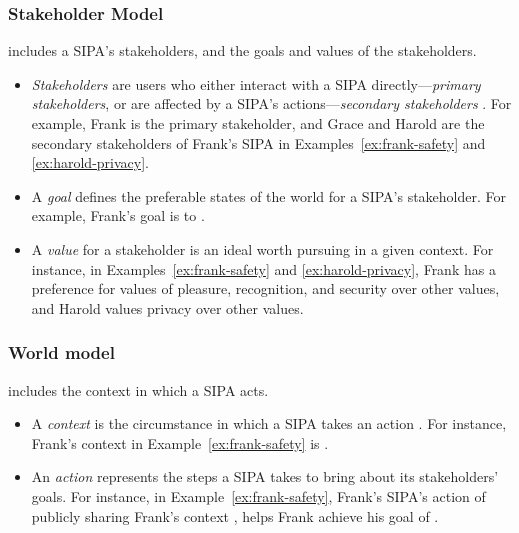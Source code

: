 \subsubsection{Stakeholder Model}
includes a SIPA's stakeholders, and the goals and values of the stakeholders. 

\begin{itemize}
\item \emph{Stakeholders} are users who either interact with a SIPA directly---\emph{primary stakeholders}, or are affected by a SIPA's actions---\emph{secondary stakeholders} \citep{Friedman-2008-value-sensitive-design}. For example, Frank is the primary stakeholder, and Grace and Harold are the secondary stakeholders of Frank's \locationapp SIPA in Examples~\ref{ex:frank-safety} and \ref{ex:harold-privacy}.
\item A \emph{goal} defines the preferable states of the world for a SIPA's stakeholder. For example, Frank's goal is to . 
\item A \emph{value} for a stakeholder is an ideal worth pursuing in a given context. For instance, in Examples~\ref{ex:frank-safety} and \ref{ex:harold-privacy}, Frank has a preference for values of pleasure, recognition, and security over other values, and Harold values privacy over other values. 
\end{itemize}

\subsubsection{World model}
includes the context in which a SIPA acts. 
\begin{itemize}
\item A \emph{context} is the circumstance in which a SIPA takes an action \citep{Murukannaiah-AAMAS14-Xipho}. For instance, Frank's context in Example~\ref{ex:frank-safety} is .
\item An \emph{action} represents the steps a SIPA takes to bring about its stakeholders' goals. 
For instance, in Example~\ref{ex:frank-safety},  Frank's \locationapp SIPA's action of publicly sharing Frank's context , helps Frank achieve his goal of . 
\end{itemize}

